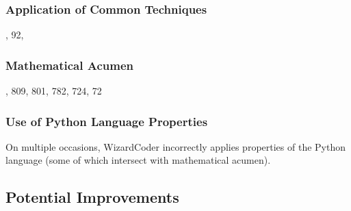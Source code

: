 \documentclass[10pt]{article}
\theoremstyle{definition}
\begin{document}
\subsubsection{Application of Common Techniques}
, 92, 

\subsubsection{Mathematical Acumen}
,  809,  801,  782,  724, 72

\subsubsection{Use of Python Language Properties}
\noindent On multiple occasions, WizardCoder incorrectly applies properties of the Python language (some of which intersect with mathematical acumen).


\noindent 
\subsection{Potential Improvements}


\end{document}
